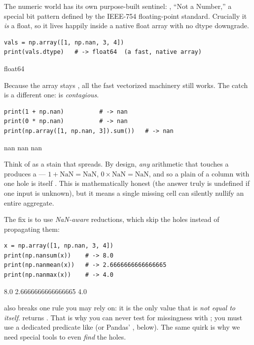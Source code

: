\documentclass[11pt]{article}
\begin{document}
The numeric world has its own purpose-built sentinel: , ``Not a Number,'' a special bit pattern defined by the IEEE-754 floating-point standard. Crucially it \emph{is} a float, so it lives happily inside a native float array with no dtype downgrade.

\begin{lstlisting}
vals = np.array([1, np.nan, 3, 4])
print(vals.dtype)   # -> float64  (a fast, native array)
\end{lstlisting}

\begin{outblock}
float64
\end{outblock}

Because the array stays , all the fast vectorized machinery still works. The catch is a different one:  is \emph{contagious}.

\begin{lstlisting}
print(1 + np.nan)          # -> nan
print(0 * np.nan)          # -> nan
print(np.array([1, np.nan, 3]).sum())   # -> nan
\end{lstlisting}

\begin{outblock}
nan
nan
nan
\end{outblock}

\begin{intuition}
Think of  as a stain that spreads. By design, \emph{any} arithmetic that touches a  produces a  --- $1 + \text{NaN} = \text{NaN}$, $0 \times \text{NaN} = \text{NaN}$, and so a plain  of a column with one hole is itself . This is mathematically honest (the answer truly is undefined if one input is unknown), but it means a single missing cell can silently nullify an entire aggregate.
\end{intuition}

The fix is to use \emph{NaN-aware} reductions, which skip the holes instead of propagating them:

\begin{lstlisting}
x = np.array([1, np.nan, 3, 4])
print(np.nansum(x))    # -> 8.0
print(np.nanmean(x))   # -> 2.6666666666666665
print(np.nanmax(x))    # -> 4.0
\end{lstlisting}

\begin{outblock}
8.0
2.6666666666666665
4.0
\end{outblock}

\begin{pyrefresh}
 also breaks one rule you may rely on: it is the only value that is \emph{not equal to itself}.  returns . That is why you can never test for missingness with ; you must use a dedicated predicate like  (or Pandas' , below). The same quirk is why we need special tools to even \emph{find} the holes.
\end{pyrefresh}
\end{document}
